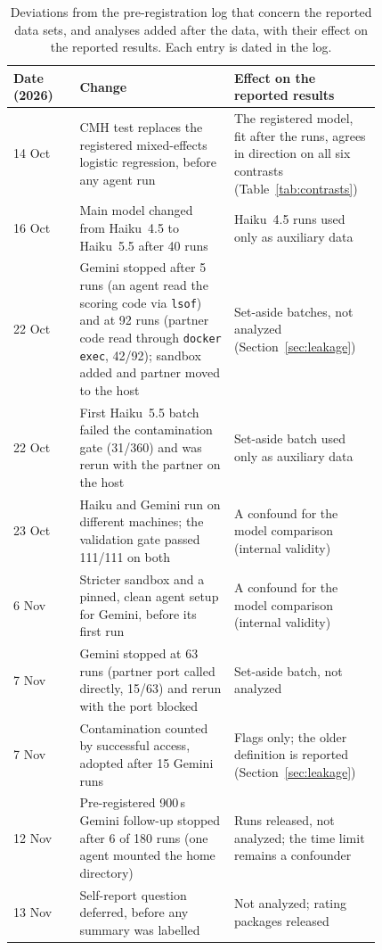 \begin{table}[t]
\centering\scriptsize
\caption{Deviations from the pre-registration log that concern the reported data sets, and analyses added after the
data, with their effect on the reported results. Each entry is dated in the log.}\label{tab:deviations}
\begin{tabular}{@{}l>{\raggedright\arraybackslash}p{0.42\linewidth}>{\raggedright\arraybackslash}p{0.40\linewidth}@{}}
\toprule
Date (2026) & Change & Effect on the reported results \\
\midrule
14 Oct & CMH test replaces the registered mixed-effects logistic regression, before any agent run & The registered model,
fit after the runs, agrees in direction on all six contrasts (Table~\ref{tab:contrasts}) \\
16 Oct & Main model changed from Haiku~4.5 to Haiku~5.5 after 40 runs & Haiku~4.5 runs used only as auxiliary data \\
22 Oct & Gemini stopped after 5 runs (an agent read the scoring code via \texttt{lsof}) and at 92 runs (partner code read
through \texttt{docker exec}, 42/92); sandbox added and partner moved to the host & Set-aside batches, not analyzed
(Section~\ref{sec:leakage}) \\
22 Oct & First Haiku~5.5 batch failed the contamination gate (31/360) and was rerun with the partner on the host &
Set-aside batch used only as auxiliary data \\
23 Oct & Haiku and Gemini run on different machines; the validation gate passed 111/111 on both & A confound for the
model comparison (internal validity) \\
6 Nov & Stricter sandbox and a pinned, clean agent setup for Gemini, before its first run & A confound for the model
comparison (internal validity) \\
7 Nov & Gemini stopped at 63 runs (partner port called directly, 15/63) and rerun with the port blocked & Set-aside
batch, not analyzed \\
7 Nov & Contamination counted by successful access, adopted after 15 Gemini runs & Flags only; the older definition is
reported (Section~\ref{sec:leakage}) \\
12 Nov & Pre-registered 900\,s Gemini follow-up stopped after 6 of 180 runs (one agent mounted the home directory) &
Runs released, not analyzed; the time limit remains a confounder \\
13 Nov & Self-report question deferred, before any summary was labelled & Not analyzed; rating packages released \\

\end{tabular}
\end{table}
